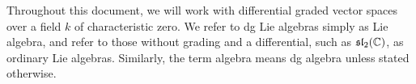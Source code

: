 \documentclass[11pt]{amsart}
\numberwithin{equation}{section}
\def\owen{\textcolor{magenta}{OG: }\textcolor{magenta}}
\begin{document}
%
%
%
%

\begin{rmk}
Throughout this document, we will work with differential graded vector spaces over a field $k$ of characteristic zero. We refer to dg Lie algebras simply as Lie algebra, and refer to those without grading and a differential, such as $\frak{sl}_2(\mathbb C)$, as ordinary Lie algebras. Similarly, the term algebra means dg algebra unless stated otherwise.
\end{rmk}
\end{document}
